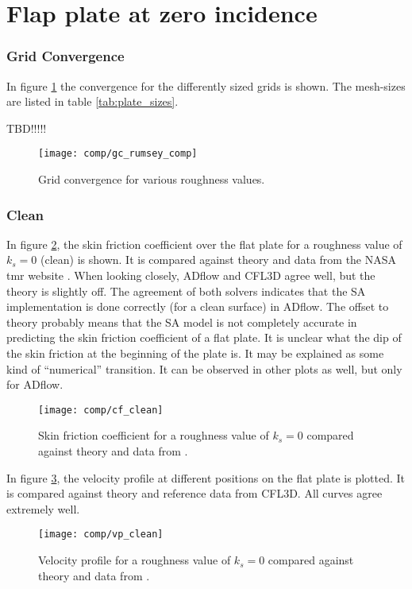 \section{Flap plate at zero incidence}

\subsubsection{Grid Convergence}
In figure \ref{fig:gc_rumsey_comp} the convergence for the differently sized
grids is shown. The mesh-sizes are listed in table \ref{tab:plate_sizes}.


TBD!!!!!

\begin{figure}[H] \centering
  \texttt{[image: comp/gc\_rumsey\_comp]}
    \caption{Grid convergence for various roughness values.}
    \label{fig:gc_rumsey_comp}
\end{figure}


\subsubsection{Clean}
In figure \ref{fig:cf_clean}, the skin friction coefficient over the flat plate
for a roughness value of $k_{s} = 0$ (clean) is shown. It is compared against
theory and data from the NASA tmr website \cite{rumsey_flat}. When looking
closely, ADflow and CFL3D agree well, but the theory is slightly off. The
agreement of both solvers indicates that the SA implementation is done correctly
(for a clean surface) in ADflow. The offset to theory probably means that the SA
model is not completely accurate in predicting the skin friction coefficient of
a flat plate.  It is unclear what the dip of the skin friction at the beginning
of the plate is. It may be explained as some kind of ``numerical'' transition. It
can be observed in other plots as well, but only for ADflow.

\begin{figure}[H] \centering
  \texttt{[image: comp/cf\_clean]}
    \caption{Skin friction coefficient for a roughness value of $k_{s} = 0$
      compared against theory and data from \cite{rumsey_flat}.}
    \label{fig:cf_clean}
\end{figure}

\noindent In figure \ref{fig:vp_clean}, the velocity profile at different
positions on the flat plate is plotted. It is compared against theory and
reference data from CFL3D. All curves agree extremely well.
\begin{figure}[H] \centering
  \texttt{[image: comp/vp\_clean]}
    \caption{Velocity profile for a roughness value of $k_{s} = 0$ compared
      against theory and  data from \cite{rumsey_flat}.}
    \label{fig:vp_clean}
\end{figure}

